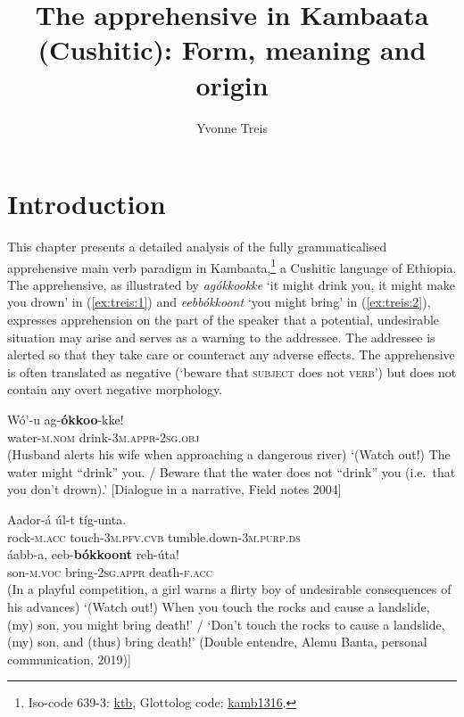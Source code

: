 \documentclass[output=paper,colorlinks,citecolor=brown,
]{langsci/langscibook}
\author{Yvonne Treis\affiliation{CNRS-LLACAN}}
\title{The apprehensive in Kambaata (Cushitic): Form, meaning and origin}
\begin{document}
\maketitle


\section{Introduction}\label{sec:treis:1}

This chapter presents a detailed analysis of the fully grammaticalised apprehensive main verb paradigm in Kambaata,\footnote{Iso-code 639-3: \href{https://iso639-3.sil.org/code/ktb} {ktb}, Glottolog code: \href{https://glottolog.org/resource/languoid/id/kamb1316} {kamb1316}.} a Cushitic language of Ethiopia. The apprehensive, as illustrated by \textit{agókkookke} `it might drink you, it might make you drown' in (\ref{ex:treis:1}) and \textit{eebbókkoont} `you might bring' in (\ref{ex:treis:2}), expresses apprehension on the part of the speaker that a potential, undesirable situation may arise and serves as a warning to the addressee. The addressee is alerted so that they take care or counteract any adverse effects. The apprehensive is often translated as negative (`beware that \textsc{subject} does not \textsc{verb}') but does not contain any overt negative morphology.

\ea\label{ex:treis:1} 
\gll Wó'-u ag-\textbf{ókkoo}-kke! \\
water-\textsc{m.nom} drink-\textsc{3m.appr-2sg.obj}\\
\glt (Husband alerts his wife when approaching a dangerous river) `(Watch out!) The water might ``drink'' you. / Beware that the water does not ``drink'' you (i.e.\ that you don't drown).' [Dialogue in a narrative, Field notes 2004]
\z

\ea\label{ex:treis:2}
\gll Aador-á			úl-t				tíg-unta.\\
rock-\textsc{m.acc} touch-\textsc{3m.pfv.cvb} tumble.down-\textsc{3m.purp.ds}\\ \newline
\gll áabb-a,		eeb-\textbf{bókkoont} reh-úta! \\
son-\textsc{m.voc}	bring-\textsc{2sg.appr} 	death-\textsc{f.acc}\\
\glt (In a playful competition, a girl warns a flirty boy of undesirable consequences of his advances) `(Watch out!) When you touch the rocks and cause a landslide, (my) son, you might bring death!' / `Don't touch the rocks to cause a landslide, (my) son, and (thus) bring death!' (Double entendre, Alemu Banta, personal communication, 2019)\footnotemark]
\z
{}
\end{document}
